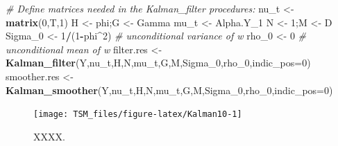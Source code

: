 \documentclass[
  12pt,
]{book}
\newenvironment{Shaded}{\begin{snugshade}}{\end{snugshade}}
\newcommand{\AttributeTok}[1]{\textcolor[rgb]{0.13,0.29,0.53}{#1}}
\newcommand{\CommentTok}[1]{\textcolor[rgb]{0.56,0.35,0.01}{\textit{#1}}}
\newcommand{\DecValTok}[1]{\textcolor[rgb]{0.00,0.00,0.81}{#1}}
\newcommand{\FunctionTok}[1]{\textcolor[rgb]{0.13,0.29,0.53}{\textbf{#1}}}
\newcommand{\NormalTok}[1]{#1}
\newcommand{\OtherTok}[1]{\textcolor[rgb]{0.56,0.35,0.01}{#1}}
\newcommand{\SpecialCharTok}[1]{\textcolor[rgb]{0.81,0.36,0.00}{\textbf{#1}}}
\theoremstyle{definition}
\theoremstyle{definition}
\theoremstyle{definition}
\theoremstyle{definition}
\theoremstyle{remark}
\begin{document}
\begin{Shaded}
\begin{Highlighting}[]
\CommentTok{\# Define matrices needed in the Kalman\_filter procedures:}
\NormalTok{nu\_t }\OtherTok{\textless{}{-}} \FunctionTok{matrix}\NormalTok{(}\DecValTok{0}\NormalTok{,T,}\DecValTok{1}\NormalTok{)}
\NormalTok{H }\OtherTok{\textless{}{-}}\NormalTok{ phi;G }\OtherTok{\textless{}{-}}\NormalTok{ Gamma}
\NormalTok{mu\_t }\OtherTok{\textless{}{-}}\NormalTok{ Alpha.Y\_1}
\NormalTok{N }\OtherTok{\textless{}{-}} \DecValTok{1}\NormalTok{;M }\OtherTok{\textless{}{-}}\NormalTok{ D}
\NormalTok{Sigma\_0 }\OtherTok{\textless{}{-}} \DecValTok{1}\SpecialCharTok{/}\NormalTok{(}\DecValTok{1}\SpecialCharTok{{-}}\NormalTok{phi}\SpecialCharTok{\^{}}\DecValTok{2}\NormalTok{) }\CommentTok{\# unconditional variance of w}
\NormalTok{rho\_0 }\OtherTok{\textless{}{-}} \DecValTok{0} \CommentTok{\# unconditional mean of w}
\NormalTok{filter.res   }\OtherTok{\textless{}{-}} \FunctionTok{Kalman\_filter}\NormalTok{(Y,nu\_t,H,N,mu\_t,G,M,Sigma\_0,rho\_0,}\AttributeTok{indic\_pos=}\DecValTok{0}\NormalTok{)}
\NormalTok{smoother.res }\OtherTok{\textless{}{-}} \FunctionTok{Kalman\_smoother}\NormalTok{(Y,nu\_t,H,N,mu\_t,G,M,Sigma\_0,rho\_0,}\AttributeTok{indic\_pos=}\DecValTok{0}\NormalTok{)}
\end{Highlighting}
\end{Shaded}

\begin{figure}
\texttt{[image: TSM\_files/figure-latex/Kalman10-1]} \caption{XXXX.}\label{fig:Kalman10}
\end{figure}
\end{document}
